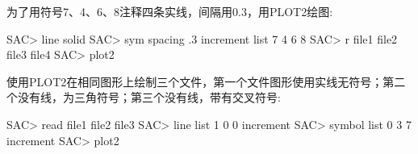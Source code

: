 为了用符号7、4、6、8注释四条实线，间隔用0.3，用PLOT2绘图:
\begin{SACCode}
SAC> line solid
SAC> sym spacing .3 increment list 7 4 6 8
SAC> r file1 file2 file3 file4
SAC> plot2
\end{SACCode}

使用PLOT2在相同图形上绘制三个文件，第一个文件图形使用实线无符号；第二个没有线，为三角符号；第三个没有线，带有交叉符号:
\begin{SACCode}
SAC> read file1 file2 file3
SAC> line list 1 0 0 increment
SAC> symbol list 0 3 7 increment
SAC> plot2
\end{SACCode}

